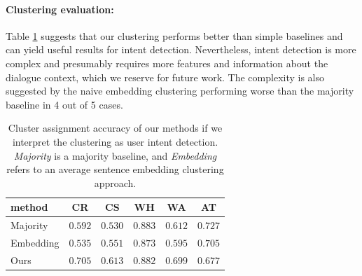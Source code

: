 \paragraph{Clustering evaluation:} 
Table \ref{table:intentclust} suggests that our clustering performs better than simple baselines and can yield useful results for intent detection.
Nevertheless, intent detection is more complex and presumably requires more features and information about the dialogue context, which we reserve for future work.
The complexity is also suggested by the naive embedding clustering performing worse than the majority baseline in 4 out of 5 cases.
\begin{table}[tp]
    \centering
    \small
    \begin{tabular}{lccccc}
    \hline
     \textbf{method} & \textbf{CR} & \textbf{CS} & \textbf{WH} & \textbf{WA} & \textbf{AT} \\
     \hline
     Majority & $0.592$ & $0.530$ & $0.883$ & $0.612$ & $\pmb{0.727}$ \\
     Embedding & $0.535$ & $0.551$ & $0.873$ & $0.595$ & $0.705$ \\
     Ours & $\pmb{0.705}$ & $\pmb{0.613}$ & $\pmb{0.882}$ & $\pmb{0.699}$ & $0.677$ \\
     \hline
    \end{tabular}
    
    \caption{Cluster assignment accuracy of our methods if we interpret the clustering as user intent detection. \textit{Majority} is a majority baseline, and \textit{Embedding} refers to an average sentence embedding clustering approach.
    }
    \label{table:intentclust}
\end{table}


